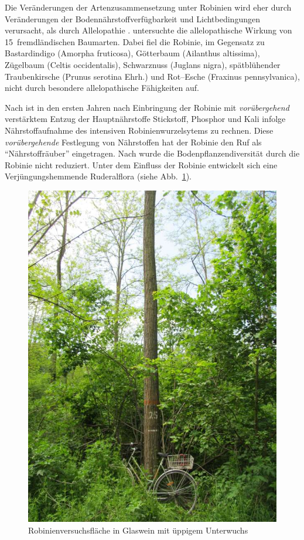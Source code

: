 \documentclass[twocolumn]{scrartcl}
\begin{document}
Die Veränderungen der Artenzusammensetzung unter Robinien wird eher
durch Veränderungen der Bodennährstoffverfügbarkeit und
Lichtbedingungen verursacht, als durch Allelopathie
\citep{vitkova2017robinie}.  \citet{csiszar2009allelopathy}
untersuchte die allelopathische Wirkung von 15~fremdländischen
Baumarten. Dabei fiel die Robinie, im Gegensatz zu Bastardindigo
(Amorpha fruticosa), Götterbaum (Ailanthus altissima), Zügelbaum
(Celtis occidentalis), Schwarznuss (Juglans nigra), spätblühender
Traubenkirsche (Prunus serotina Ehrh.) und Rot--Esche (Fraxinus
pennsylvanica), nicht durch besondere allelopathische Fähigkeiten auf.

Nach \citet{mueller1991robinie} ist in den
ersten Jahren nach Einbringung der Robinie mit \emph{vorübergehend}
verstärktem Entzug der Hauptnährstoffe Stickstoff, Phosphor und Kali
infolge Nährstoffaufnahme des intensiven Robinienwurzelsytems zu
rechnen. Diese \emph{vorübergehende} Festlegung von Nährstoffen hat
der Robinie den Ruf als \enquote{Nährstoffräuber} eingetragen. Nach
\citet{sitzia2012robinie} wurde die Bodenpflanzendiversität durch die
Robinie nicht reduziert. Unter dem Einfluss der Robinie entwickelt
sich eine Verjüngungshemmende Ruderalflora (siehe
Abb.~\ref{fig:glaswein}).

\begin{figure}[htbp]
  \centering
  \includegraphics[width=.9\linewidth]{./bild/GlasweinRobinie2023a}
  \caption{Robinienversuchsfläche in Glaswein mit üppigem Unterwuchs}
  \label{fig:glaswein}
\end{figure}
\end{document}
